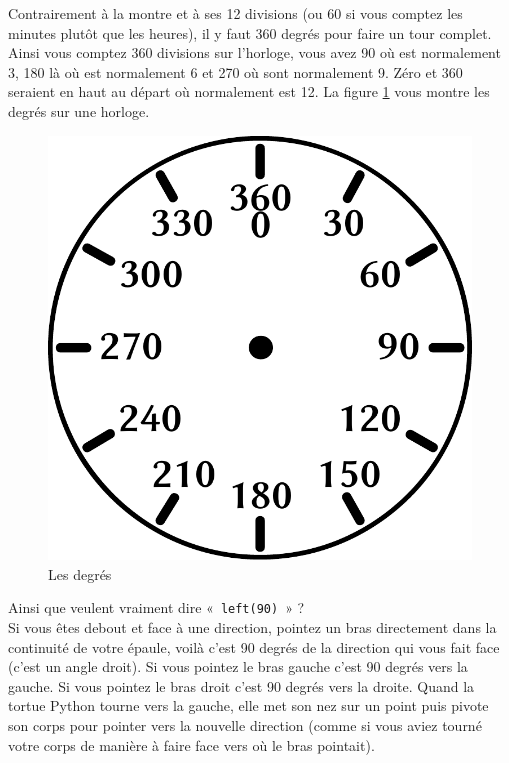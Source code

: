Contrairement à la montre et à ses 12 divisions (ou 60 si vous comptez les minutes plutôt que les heures), il y faut 360 degrés pour faire un tour complet. Ainsi vous comptez 360 divisions sur l'horloge, vous avez 90 où est normalement 3, 180 là où est normalement 6 et 270 où sont normalement 9. Zéro et 360 seraient en haut au départ où normalement est 12. La figure \ref{fig:degres} vous montre les degrés sur une horloge.
\begin{figure}[H]
\centering
\includegraphics[scale=0.5]{images/degres.pdf}
\caption{Les degrés}
\label{fig:degres}
\end{figure}

Ainsi que veulent vraiment dire «~\texttt{left(90)}~»  ?\\

Si vous êtes debout et face à une direction, pointez un bras directement dans la continuité de votre épaule, voilà c'est 90 degrés de la direction qui vous fait face (c'est un angle droit). Si vous pointez le bras gauche c'est 90 degrés vers la gauche. Si vous pointez le bras droit c'est 90 degrés vers la droite. Quand la tortue Python tourne vers la gauche, elle met son nez sur un point puis pivote son corps pour pointer vers la nouvelle direction (comme si vous aviez tourné votre corps de manière à faire face vers où le bras pointait).\\

